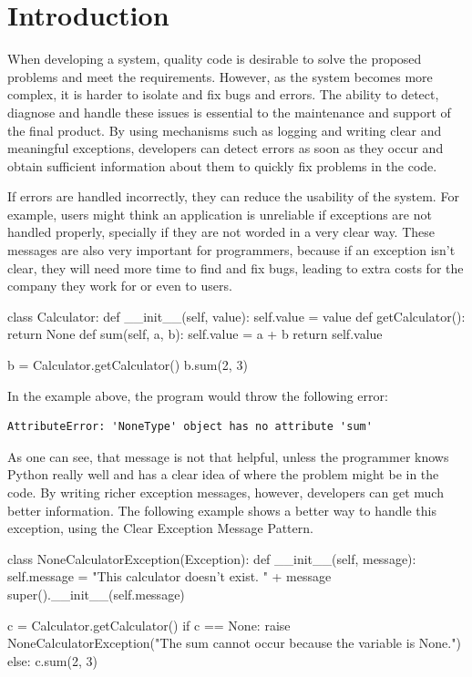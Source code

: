 \documentclass[12pt]{article}
\begin{document}
\section{Introduction}

When developing a system, quality code is desirable to solve the proposed problems and meet the requirements. However, as the system becomes more complex, it is harder to isolate and fix bugs and errors. The ability to detect, diagnose and handle these issues is essential to the maintenance and support of the final product. By using mechanisms such as logging and writing clear and meaningful exceptions, developers can detect errors as soon as they occur and obtain sufficient information about them to quickly fix problems in the code.

If errors are handled incorrectly, they can reduce the usability of the system. For example, users might think an application is unreliable if exceptions are not handled properly, specially if they are not worded in a very clear way. These messages are also very important for programmers, because if an exception isn't clear, they will need more time to find and fix bugs, leading to extra costs for the company they work for or even to users. \\

\begin{python}[caption="Generic error given by the language",captionpos=b,label="generic_error"] 
class Calculator:
	def __init__(self, value):
		self.value = value
	def getCalculator():
		return None
	def sum(self, a, b):
		self.value = a + b
		return self.value

b = Calculator.getCalculator()
b.sum(2, 3)
\end{python}

In the example above, the program would throw the following error: 
\begin{verbatim}
AttributeError: 'NoneType' object has no attribute 'sum'
\end{verbatim} \hfill \newline
As one can see, that message is not that helpful, unless the programmer knows Python really well and has a clear idea of where the problem might be in the code. By writing richer exception messages, however, developers can get much better information. The following example shows a better way to handle this exception, using the Clear Exception Message Pattern. \\

\begin{python}[breaklines=true,caption="Treatment of exception",captionpos=b] 
class NoneCalculatorException(Exception):
	def __init__(self, message):
		self.message = "This calculator doesn't exist. " + message
		super().__init__(self.message)

c = Calculator.getCalculator()
if c == None:
	raise NoneCalculatorException("The sum cannot occur because the variable is None.")
else:
	c.sum(2, 3)
\end{python}
\end{document}
